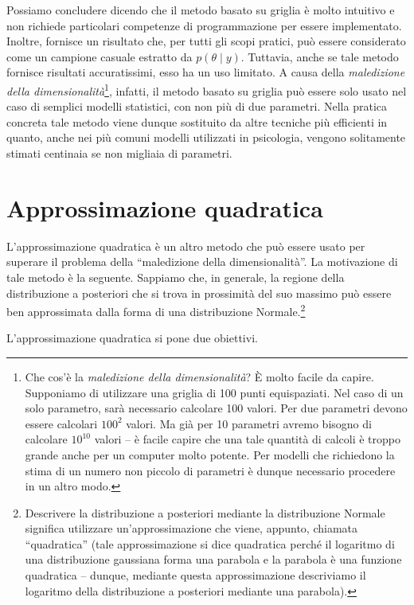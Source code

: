 \documentclass[
  10pt,
  italian,
  a4paper,
  extrafontsizes,onecolumn,openright
  ]{memoir}
\begin{document}
Possiamo concludere dicendo che il metodo basato su griglia è molto intuitivo e non richiede particolari competenze di programmazione per essere implementato. Inoltre, fornisce un risultato che, per tutti gli scopi pratici, può essere considerato come un campione casuale estratto da \(p(\theta \mid y)\). Tuttavia, anche se tale metodo fornisce risultati accuratissimi, esso ha un uso limitato. A causa della \emph{maledizione della dimensionalità}\footnote{Che cos'è la \emph{maledizione della dimensionalità}? È molto facile da capire. Supponiamo di utilizzare una griglia di 100 punti equispaziati. Nel caso di un solo parametro, sarà necessario calcolare 100 valori. Per due parametri devono essere calcolari \(100^2\) valori. Ma già per 10 parametri avremo bisogno di calcolare \(10^{10}\) valori -- è facile capire che una tale quantità di calcoli è troppo grande anche per un computer molto potente. Per modelli che richiedono la stima di un numero non piccolo di parametri è dunque necessario procedere in un altro modo.}, infatti, il metodo basato su griglia può essere solo usato nel caso di semplici modelli statistici, con non più di due parametri. Nella pratica concreta tale metodo viene dunque sostituito da altre tecniche più efficienti in quanto, anche nei più comuni modelli utilizzati in psicologia, vengono solitamente stimati centinaia se non migliaia di parametri.

\hypertarget{approssimazione-quadratica}{%
\section{Approssimazione quadratica}\label{approssimazione-quadratica}}

L'approssimazione quadratica è un altro metodo che può essere usato per superare il problema della ``maledizione della dimensionalità''. La motivazione di tale metodo è la seguente. Sappiamo che, in generale, la regione della distribuzione a posteriori che si trova in prossimità del suo massimo può essere ben approssimata dalla forma di una distribuzione Normale.\footnote{Descrivere la distribuzione a posteriori mediante la distribuzione Normale significa utilizzare un'approssimazione che viene, appunto, chiamata ``quadratica'' (tale approssimazione si dice quadratica perché il logaritmo di una distribuzione gaussiana forma una parabola e la parabola è una funzione quadratica -- dunque, mediante questa approssimazione descriviamo il logaritmo della distribuzione a posteriori mediante una parabola).}

L'approssimazione quadratica si pone due obiettivi.
\end{document}
